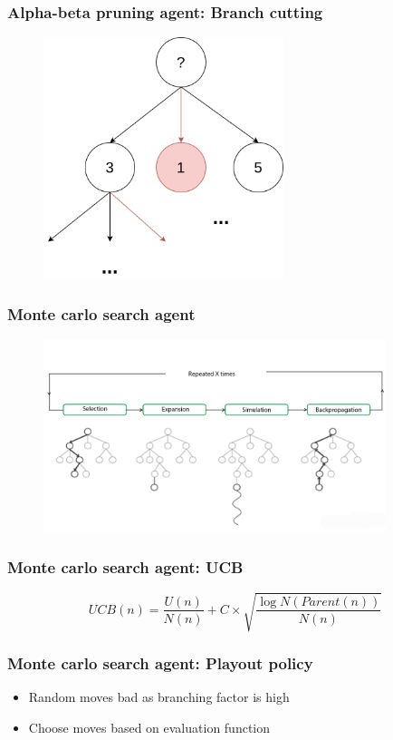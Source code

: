 \documentclass{beamer}
\begin{document}
\begin{frame}
	\frametitle{Alpha-beta pruning agent: Branch cutting}
	\begin{figure}
		\centering
		\includegraphics[width=7cm, keepaspectratio]{branch_cutting.png}
	\end{figure}
\end{frame}

\begin{frame}
	\frametitle{Monte carlo search agent}
	\begin{figure}
		\centering
		\includegraphics[width=10cm, keepaspectratio]{mcts_algo.png}
	\end{figure}
\end{frame}

\begin{frame}
	\frametitle{Monte carlo search agent: UCB}
	$$
		UCB(n) = \frac{U(n)}{N(n)} + C \times \sqrt{\frac{\log{N(Parent(n))}}{N(n)}}
	$$
\end{frame}
\begin{frame}
	\frametitle{Monte carlo search agent: Playout policy}
	\begin{itemize}
		\item Random moves bad as branching factor is high
		\item Choose moves based on evaluation function
	\end{itemize}
\end{frame}
\end{document}
